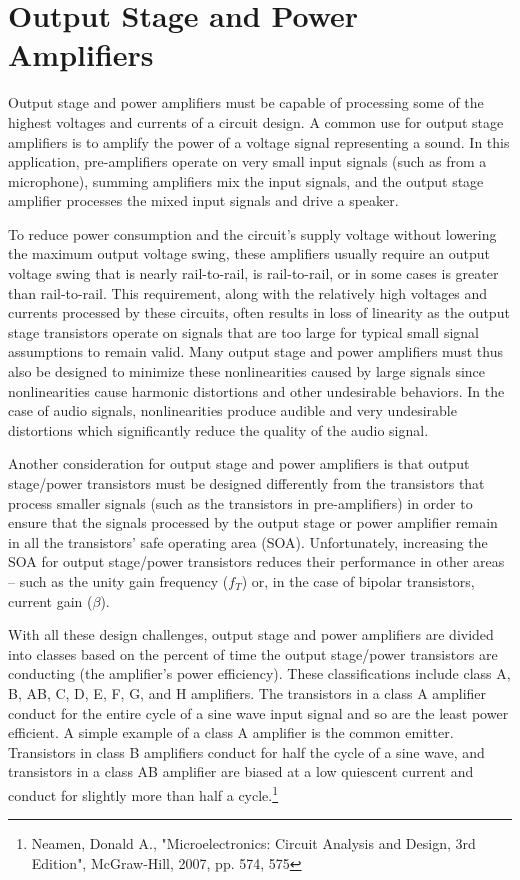 \chapter{Output Stage and Power Amplifiers}

Output stage and power amplifiers must be capable of processing some of the highest voltages and currents of a circuit design. A common use for output stage amplifiers is to amplify the power of a voltage signal representing a sound. In this application, pre-amplifiers operate on very small input signals (such as from a microphone), summing amplifiers mix the input signals, and the output stage amplifier processes the mixed input signals and drive a speaker.
\par
To reduce power consumption and the circuit's supply voltage without lowering the maximum output voltage swing, these amplifiers usually require an output voltage swing that is nearly rail-to-rail, is rail-to-rail, or in some cases is greater than rail-to-rail. This requirement, along with the relatively high voltages and currents processed by these circuits, often results in loss of linearity as the output stage transistors operate on signals that are too large for typical small signal assumptions to remain valid. Many output stage and power amplifiers must thus also be designed to minimize these nonlinearities caused by large signals since nonlinearities cause harmonic distortions and other undesirable behaviors. In the case of audio signals, nonlinearities produce audible and very undesirable distortions which significantly reduce the quality of the audio signal.
\par
Another consideration for output stage and power amplifiers is that output stage/power transistors must be designed differently from the transistors that process smaller signals (such as the transistors in pre-amplifiers) in order to ensure that the signals processed by the output stage or power amplifier remain in all the transistors' safe operating area (SOA). Unfortunately, increasing the SOA for output stage/power transistors reduces their performance in other areas -- such as the unity gain frequency ($f_{T}$) or, in the case of bipolar transistors, current gain ($\beta$).
\par
With all these design challenges, output stage and power amplifiers are divided into classes based on the percent of time the output stage/power transistors are conducting (the amplifier's power efficiency). These classifications include class A, B, AB, C, D, E, F, G, and H amplifiers. The transistors in a class A amplifier conduct for the entire cycle of a sine wave input signal and so are the least power efficient. A simple example of a class A amplifier is the common emitter. Transistors in class B amplifiers conduct for half the cycle of a sine wave, and transistors in a class AB amplifier are biased at a low quiescent current and conduct for slightly more than half a cycle.\footnote{Neamen, Donald A., "Microelectronics: Circuit Analysis and Design, 3rd Edition", McGraw-Hill, 2007, pp. 574, 575}
